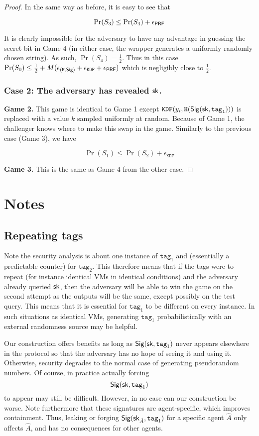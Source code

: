 \documentclass[12pt]{article}
\begin{document}
\begin{proof}
In the same way as before, it is easy to see that 

$$
\Pr(S_3) \le \Pr(S_4) + \epsilon_{\mathsf{PRF}}
$$

It is clearly impossible for the adversary to have any advantage in guessing the secret bit in Game 4 (in either case, the wrapper generates a uniformly randomly chosen string). As such, $\Pr(S_4) = \frac{1}{2}$. Thus in this case $\Pr(S_0) \le \frac{1}{2} + M( \epsilon_{(\texttt{H}, \mathsf{Sig})} + \epsilon_{\texttt{KDF}} + \epsilon_{\mathsf{PRF}})$ which is negligibly close to $\frac{1}{2}$.

\subsubsection*{Case 2: The adversary has revealed $\mathsf{sk}$.}

\noindent \textbf{Game 2.} This game is identical to Game 1 except $\texttt{KDF}(y_i, \texttt{H}(\mathsf{Sig} (\mathsf{sk}, \texttt{tag}_1)))$ is replaced with a value $k$ sampled uniformly at random. Because of Game 1, the challenger knows where to make this swap in the game. Similarly to the previous case (Game 3), we have

$$
\Pr(S_1) \le \Pr(S_2) + \epsilon_{\texttt{KDF}}
$$

\noindent \textbf{Game 3.} This is the same as Game 4 from the other case.
\end{proof}

\section{Notes} \label{sec:notes}

\subsection{Repeating tags}
Note the security analysis is about one instance of $\texttt{tag}_1$ and (essentially a predictable counter) for $\texttt{tag}_2$. This therefore means that if the tags were to repeat (for instance identical VMs in identical conditions) and the adversary already queried $\mathsf{sk}$, then the adversary will be able to win the game on the second attempt as the outputs will be the same, except possibly on the test query. This means that it is essential for $\texttt{tag}_1$ to be different on every instance. In such situations as identical VMs, generating $\texttt{tag}_1$ probabilistically with an external randomness source may be helpful.

Our construction offers benefits as long as $\mathsf{Sig} (\mathsf{sk}, \texttt{tag}_1)$ never appears elsewhere in
the protocol so that the adversary has no hope of seeing it and using
it. Otherwise, security degrades to the normal case of generating
pseudorandom numbers. Of course, in practice actually
forcing $$\mathsf{Sig} (\mathsf{sk}, \texttt{tag}_1)$$ to appear may still be difficult. However,
in no case can our construction be worse. Note furthermore that these
signatures are agent-specific, which improves containment. Thus, leaking
or forging $\mathsf{Sig} (\mathsf{sk}_{\hat A}, \texttt{tag}_1)$ for a specific agent $\hat A$ only affects $\hat A$, and
has no consequences for other agents.




\end{document}
